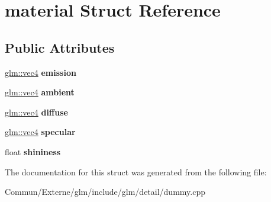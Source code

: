 \hypertarget{structmaterial}{}\section{material Struct Reference}
\label{structmaterial}
\subsection*{Public Attributes}
\begin{DoxyCompactItemize}
\item 
\hyperlink{group__core__types_ga5881b1b022d7fd1b7218f5916532dd02}{glm\+::vec4} {\bfseries emission}\hypertarget{structmaterial_a76b696726a2ea73e6840001821942bc3}{}\label{structmaterial_a76b696726a2ea73e6840001821942bc3}

\item 
\hyperlink{group__core__types_ga5881b1b022d7fd1b7218f5916532dd02}{glm\+::vec4} {\bfseries ambient}\hypertarget{structmaterial_a944296102e90b1610967530458f40ba1}{}\label{structmaterial_a944296102e90b1610967530458f40ba1}

\item 
\hyperlink{group__core__types_ga5881b1b022d7fd1b7218f5916532dd02}{glm\+::vec4} {\bfseries diffuse}\hypertarget{structmaterial_a506a0cc33282fa76872c6aeebd688b39}{}\label{structmaterial_a506a0cc33282fa76872c6aeebd688b39}

\item 
\hyperlink{group__core__types_ga5881b1b022d7fd1b7218f5916532dd02}{glm\+::vec4} {\bfseries specular}\hypertarget{structmaterial_a452d07b4570da7204caeaf798cd01a77}{}\label{structmaterial_a452d07b4570da7204caeaf798cd01a77}

\item 
float {\bfseries shininess}\hypertarget{structmaterial_aa3740fd7908ec5a11bbc4a4bd5b21abc}{}\label{structmaterial_aa3740fd7908ec5a11bbc4a4bd5b21abc}

\end{DoxyCompactItemize}


The documentation for this struct was generated from the following file\+:\begin{DoxyCompactItemize}
\item 
Commun/\+Externe/glm/include/glm/detail/dummy.\+cpp\end{DoxyCompactItemize}
